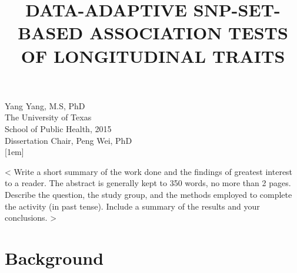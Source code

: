 \documentclass[12pt]{article}
\begin{document}
\newpage
\thispagestyle{empty}
\doublespacing
\begin{titlepage}
\begin{center}
\title{\normalsize DATA-ADAPTIVE SNP-SET-BASED ASSOCIATION TESTS OF LONGITUDINAL TRAITS}
\date{}
\maketitle

\singlespacing
Yang Yang, M.S, PhD\\
The University of Texas\\
School of Public Health, 2015\\
[1em]
Dissertation Chair, Peng Wei, PhD\\
[1em]

\doublespacing
< Write a short summary of the work done and the findings of greatest interest to a reader.  The abstract is generally kept to 350 words, no more than 2 pages.  Describe the question, the study group, and the methods employed to complete the activity (in past tense).  Include a summary of the results and your conclusions. >  


\end{center}
\end{titlepage}


\newpage
\tableofcontents

\newpage
\listoftables

\newpage
\listoffigures
 

\newpage
\section{Background}\label{sec:background}
\end{document}
